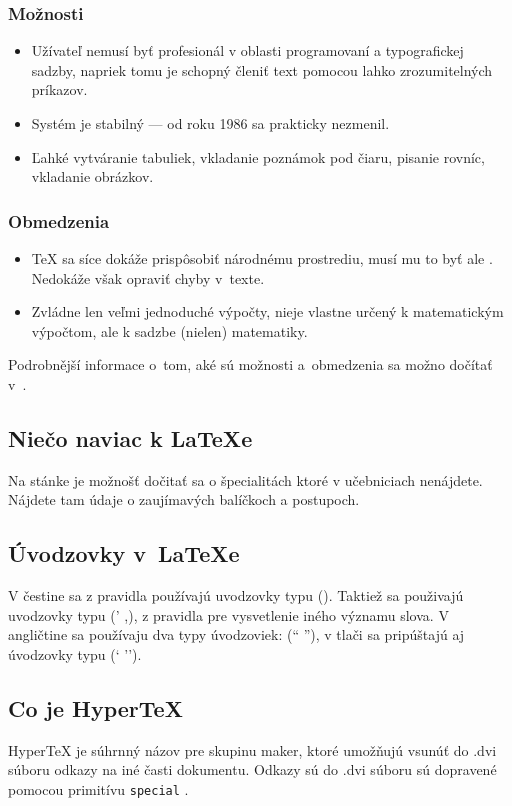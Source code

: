 \documentclass[a4paper, 11pt]{article}
\begin{document}
	\subsubsection{Možnosti}	
	\begin{itemize}
		\item Užívateľ nemusí byť profesionál v oblasti programovaní a typografickej sadzby, napriek tomu je schopný členiť text pomocou lahko zrozumitelných príkazov.
		\item Systém je stabilný — od roku 1986 sa prakticky nezmenil.
		\item Ľahké vytváranie tabuliek, vkladanie poznámok pod čiaru, pisanie rovníc, vkladanie obrázkov.
	\end{itemize}
	
	\subsubsection{Obmedzenia}
	\begin{itemize}
		\item {\TeX} sa síce dokáže prispôsobiť národnému prostrediu, musí mu to byť ale . Nedokáže však opraviť chyby v~texte.
		\item Zvládne len veľmi jednoduché výpočty, nieje vlastne určený k matematickým výpočtom, ale k sadzbe (nielen) matematiky.
	\end{itemize}
	Podrobnější informace o~tom, aké sú možnosti a~obmedzenia sa možno dočítať v~\cite{Solcova2012}.


	\subsection{Niečo naviac k {\LaTeX}e}
	Na stánke \cite{Martinek2010} je možnošť dočitať sa o špecialitách ktoré v učebniciach nenájdete. Nájdete tam údaje o zaujímavých balíčkoch a postupoch.


	\subsection{Úvodzovky v~{\LaTeX}e}
	V čestine sa z pravidla používajú uvodzovky typu (\uv{ }). Taktiež sa použivajú uvodzovky typu {(' ,)}, z pravidla pre vysvetlenie iného významu slova. V angličtine sa používaju dva typy úvodzoviek: (`` ''), v tlači sa pripúštajú aj úvodzovky typu (` ''). \cite{Olsak1997}
	
	
	\subsection{Co je Hyper\TeX}
	Hyper{\TeX} je súhrnný názov pre skupinu maker, ktoré umožňujú vsunúť do .dvi súboru odkazy na iné časti dokumentu. Odkazy sú do .dvi súboru sú dopravené pomocou primitívu \texttt{special} \cite{Neme2003}.
\end{document}
